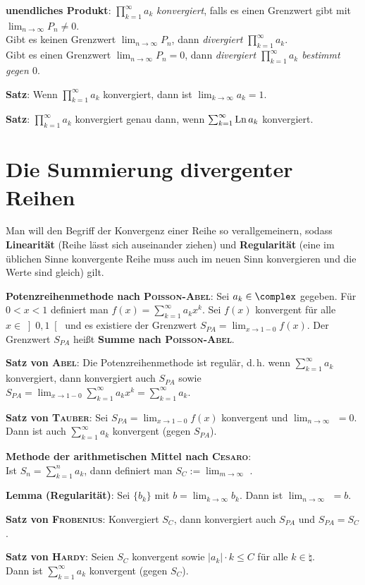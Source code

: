 \textbf{unendliches Produkt}:
$\prod_{k=1}^\infty a_k$ \emph{konvergiert}, falls es einen Grenzwert gibt mit
$\lim_{n \to \infty} P_n \not= 0$. \\
Gibt es keinen Grenzwert $\lim_{n \to \infty} P_n$, dann \emph{divergiert}
$\prod_{k=1}^\infty a_k$. \\
Gibt es einen Grenzwert $\lim_{n \to \infty} P_n = 0$, dann \emph{divergiert
$\prod_{k=1}^\infty a_k$ bestimmt gegen $0$}.

\textbf{Satz}: Wenn $\prod_{k=1}^\infty a_k$ konvergiert, dann ist
$\lim_{k \to \infty} a_k = 1$.

\textbf{Satz}: $\prod_{k=1}^\infty a_k$ konvergiert genau dann, wenn
$\sum_{k=1}^\infty \operatorname{Ln} a_k$ konvergiert.

\section{%
    Die Summierung divergenter Reihen%
}

Man will den Begriff der Konvergenz einer Reihe so verallgemeinern, sodass
\textbf{Linearität} (Reihe lässt sich auseinander ziehen) und
\textbf{Regularität} (eine im üblichen Sinne konvergente Reihe muss auch im
neuen Sinn konvergieren und die Werte sind gleich) gilt.

\linie

\textbf{Potenzreihenmethode nach \textsc{Poisson}-\textsc{Abel}}:
Sei $a_k \in \complex$ gegeben.
Für $0 < x < 1$ definiert man $f(x) = \sum_{k=1}^\infty a_k x^k$.
Sei $f(x)$ konvergent für alle $x \in \left]0,1\right[$ und es existiere
der Grenzwert $S_{PA} = \lim_{x \to 1-0} f(x)$.
Der Grenzwert $S_{PA}$ heißt
\textbf{Summe nach \textsc{Poisson}-\textsc{Abel}}.

\textbf{Satz von \textsc{Abel}}:
Die Potenzreihenmethode ist regulär, d.\,h. wenn $\sum_{k=1}^\infty a_k$
konvergiert, dann konvergiert auch $S_{PA}$ sowie
$S_{PA} = \lim_{x \to 1-0} \sum_{k=1}^\infty a_k x^k = \sum_{k=1}^\infty a_k$.

\textbf{Satz von \textsc{Tauber}}:
Sei $S_{PA} = \lim_{x \to 1-0} f(x)$ konvergent und
$\lim_{n \to \infty}$ 
$= 0$. \\
Dann ist auch $\sum_{k=1}^\infty a_k$ konvergent (gegen $S_{PA}$).

\linie

\textbf{Methode der arithmetischen Mittel nach \textsc{Cesaro}}: \\
Ist $S_n = \sum_{k=1}^n a_k$, dann definiert man
$S_C := \lim_{m \to \infty}$ .

\textbf{Lemma (Regularität)}: Sei $\{b_k\}$ mit
$b = \lim_{k \to \infty} b_k$. \qquad
Dann ist $\lim_{n \to \infty}$  $= b$.

\textbf{Satz von \textsc{Frobenius}}:
Konvergiert $S_C$, dann konvergiert auch $S_{PA}$ und $S_{PA} = S_C$.

\textbf{Satz von \textsc{Hardy}}:
Seien $S_C$ konvergent sowie $|a_k| \cdot k \le C$ für alle
$k \in \natural$. \\
Dann ist $\sum_{k=1}^\infty a_k$ konvergent (gegen $S_C$).

\pagebreak
